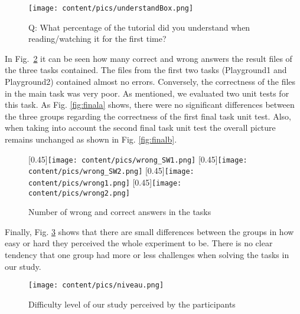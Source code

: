 \begin{figure}
	\centering
	\texttt{[image: content/pics/understandBox.png]}
	\caption{Q: What percentage of the tutorial did you understand when reading/watching it for the first time?}
		\label{fig:understandBox}
\end{figure}


In Fig.~\ref{fig:wrong_answers} it can be seen how many correct and wrong answers the result files of the three tasks contained. The files from the first two tasks (Playground1 and Playground2) contained almost no errors. Conversely, the correctness of the files in the main task was very poor. As mentioned, we evaluated two unit tests for this task. As Fig. \ref{fig:finala} shows, there were no significant differences between the three groups regarding the correctness of the first final task unit test. Also, when taking into account the second final task unit test the overall picture remains unchanged as shown in Fig. \ref{fig:finalb}.

\begin{figure}
	\centering
	[0.45\linewidth]{\texttt{[image: content/pics/wrong\_SW1.png]}}
	[0.45\linewidth]{\texttt{[image: content/pics/wrong\_SW2.png]}}
	[0.45\linewidth]{\texttt{[image: content/pics/wrong1.png]}}
	[0.45\linewidth]{\texttt{[image: content/pics/wrong2.png]}}
	\caption{Number of wrong and correct answers in the tasks}
	\label{fig:wrong_answers}
\end{figure}


Finally, Fig. \ref{fig:niveau} shows that there are small differences between the groups in how easy or hard they perceived the whole experiment to be. There is no clear tendency that one group had more or less challenges when solving the tasks in our study.

\begin{figure}
	\centering
	\texttt{[image: content/pics/niveau.png]}
	\caption{Difficulty level of our study perceived by the participants}
	\label{fig:niveau}
\end{figure}





